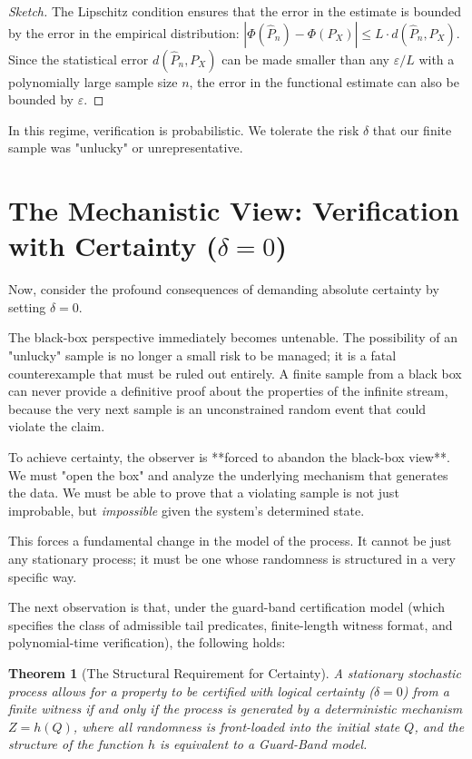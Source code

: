 \documentclass[12pt]{article}
\theoremstyle{definition}
\theoremstyle{plain}
\newtheorem{theorem}{Theorem}[section]
\begin{document}
\begin{proof}[Sketch]
The Lipschitz condition ensures that the error in the estimate is bounded by the error in the empirical distribution: $|\Phi(\widehat{P}_n) - \Phi(P_X)| \le L \cdot d(\widehat{P}_n, P_X)$. Since the statistical error $d(\widehat{P}_n, P_X)$ can be made smaller than any $\varepsilon/L$ with a polynomially large sample size $n$, the error in the functional estimate can also be bounded by $\varepsilon$.
\end{proof}

In this regime, verification is probabilistic. We tolerate the risk $\delta$ that our finite sample was "unlucky" or unrepresentative.



\section{The Mechanistic View: Verification with Certainty ($\delta = 0$)}

Now, consider the profound consequences of demanding absolute certainty by setting $\delta = 0$.

The black-box perspective immediately becomes untenable. The possibility of an "unlucky" sample is no longer a small risk to be managed; it is a fatal counterexample that must be ruled out entirely. A finite sample from a black box can never provide a definitive proof about the properties of the infinite stream, because the very next sample is an unconstrained random event that could violate the claim.

To achieve certainty, the observer is **forced to abandon the black-box view**. We must "open the box" and analyze the underlying mechanism that generates the data. We must be able to prove that a violating sample is not just improbable, but \emph{impossible} given the system's determined state.

This forces a fundamental change in the model of the process. It cannot be just any stationary process; it must be one whose randomness is structured in a very specific way.

The next observation is that, under the guard-band certification model (which specifies the class of admissible tail predicates, finite-length witness format, and polynomial-time verification), the following holds:

\begin{theorem}[The Structural Requirement for Certainty]
A stationary stochastic process allows for a property to be certified with logical certainty ($\delta=0$) from a finite witness if and only if the process is generated by a deterministic mechanism $Z=h(Q)$, where all randomness is front-loaded into the initial state $Q$, and the structure of the function $h$ is equivalent to a Guard-Band model.
\end{theorem}
\end{document}
